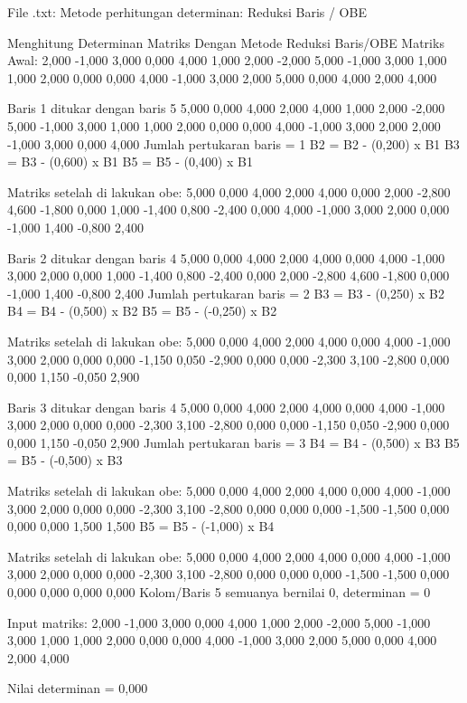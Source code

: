 \documentclass[12pt]{article}
\begin{document}
\begin{enumerate}
\begin{keluaran}
File .txt:
Metode perhitungan determinan: Reduksi Baris / OBE

Menghitung Determinan Matriks Dengan Metode Reduksi Baris/OBE
Matriks Awal:
2,000 -1,000 3,000 0,000 4,000 
1,000 2,000 -2,000 5,000 -1,000 
3,000 1,000 1,000 2,000 0,000 
0,000 4,000 -1,000 3,000 2,000 
5,000 0,000 4,000 2,000 4,000 

Baris 1 ditukar dengan baris 5
5,000 0,000 4,000 2,000 4,000 
1,000 2,000 -2,000 5,000 -1,000 
3,000 1,000 1,000 2,000 0,000 
0,000 4,000 -1,000 3,000 2,000 
2,000 -1,000 3,000 0,000 4,000 
Jumlah pertukaran baris = 1
B2 = B2 - (0,200) x B1
B3 = B3 - (0,600) x B1
B5 = B5 - (0,400) x B1

Matriks setelah di lakukan obe: 
5,000 0,000 4,000 2,000 4,000 
0,000 2,000 -2,800 4,600 -1,800 
0,000 1,000 -1,400 0,800 -2,400 
0,000 4,000 -1,000 3,000 2,000 
0,000 -1,000 1,400 -0,800 2,400 

Baris 2 ditukar dengan baris 4
5,000 0,000 4,000 2,000 4,000 
0,000 4,000 -1,000 3,000 2,000 
0,000 1,000 -1,400 0,800 -2,400 
0,000 2,000 -2,800 4,600 -1,800 
0,000 -1,000 1,400 -0,800 2,400 
Jumlah pertukaran baris = 2
B3 = B3 - (0,250) x B2
B4 = B4 - (0,500) x B2
B5 = B5 - (-0,250) x B2

Matriks setelah di lakukan obe: 
5,000 0,000 4,000 2,000 4,000 
0,000 4,000 -1,000 3,000 2,000 
0,000 0,000 -1,150 0,050 -2,900 
0,000 0,000 -2,300 3,100 -2,800 
0,000 0,000 1,150 -0,050 2,900 

Baris 3 ditukar dengan baris 4
5,000 0,000 4,000 2,000 4,000 
0,000 4,000 -1,000 3,000 2,000 
0,000 0,000 -2,300 3,100 -2,800 
0,000 0,000 -1,150 0,050 -2,900 
0,000 0,000 1,150 -0,050 2,900 
Jumlah pertukaran baris = 3
B4 = B4 - (0,500) x B3
B5 = B5 - (-0,500) x B3

Matriks setelah di lakukan obe: 
5,000 0,000 4,000 2,000 4,000 
0,000 4,000 -1,000 3,000 2,000 
0,000 0,000 -2,300 3,100 -2,800 
0,000 0,000 0,000 -1,500 -1,500 
0,000 0,000 0,000 1,500 1,500 
B5 = B5 - (-1,000) x B4

Matriks setelah di lakukan obe: 
5,000 0,000 4,000 2,000 4,000 
0,000 4,000 -1,000 3,000 2,000 
0,000 0,000 -2,300 3,100 -2,800 
0,000 0,000 0,000 -1,500 -1,500 
0,000 0,000 0,000 0,000 0,000 
Kolom/Baris 5 semuanya bernilai 0, determinan = 0

Input matriks:
2,000	-1,000	3,000	0,000	4,000
1,000	2,000	-2,000	5,000	-1,000
3,000	1,000	1,000	2,000	0,000
0,000	4,000	-1,000	3,000	2,000
5,000	0,000	4,000	2,000	4,000

Nilai determinan = 0,000


\end{keluaran}
\end{enumerate}
\end{document}
